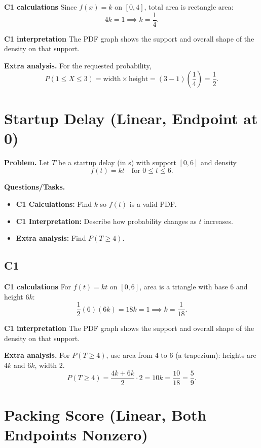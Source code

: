 \textbf{C1 calculations}
Since $f(x)=k$ on $[0,4]$, total area is rectangle area:
	\[
	4k=1\implies k=\frac14.
	\]

\textbf{C1 interpretation}
The PDF graph shows the support and overall shape of the density on that support.

\textbf{Extra analysis.}
For the requested probability,
\[
P(1\le X\le3)=\text{width}\times\text{height}=(3-1)\left(\frac14\right)=\frac12.
\]

	\section{Startup Delay (Linear, Endpoint at 0)}
	
	\textbf{Problem.}
	Let $T$ be a startup delay (in s) with support $[0,6]$ and density
	\[
	f(t)=kt\quad\text{for }0\le t\le 6.
	\]
	
	\textbf{Questions/Tasks.}
	\begin{itemize}
		\item \textbf{C1 Calculations:} Find $k$ so $f(t)$ is a valid PDF.
		\item \textbf{C1 Interpretation:} Describe how probability changes as $t$ increases.
		\item \textbf{Extra analysis:} Find $P(T\ge 4)$.
	\end{itemize}

	\subsection*{C1}

\textbf{C1 calculations}
For $f(t)=kt$ on $[0,6]$, area is a triangle with base $6$ and height $6k$:
	\[
	\frac12(6)(6k)=18k=1\implies k=\frac1{18}.
	\]

\textbf{C1 interpretation}
The PDF graph shows the support and overall shape of the density on that support.

\textbf{Extra analysis.}
For $P(T\ge4)$, use area from $4$ to $6$ (a trapezium): heights are $4k$ and $6k$, width $2$.
\[
P(T\ge4)=\frac{4k+6k}{2}\cdot2=10k=\frac{10}{18}=\frac59.
\]


\section{Packing Score (Linear, Both Endpoints Nonzero)}

